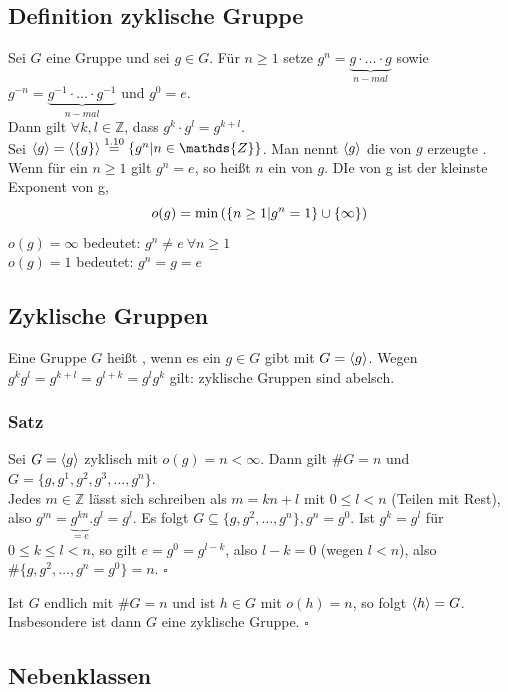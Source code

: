 \subsection{Definition zyklische Gruppe}
\label{sub:def_zyklische_gruppen}
Sei $G$ eine Gruppe und sei $g\in G$. Für $n\ge 1$ setze $g^n=\underbrace{g\cdot \dots \cdot g}_{n-mal}$ sowie $g^{-n}=\underbrace{g^{-1}\cdot \dots \cdot g^{-1}}_{n-mal}$ und $g^0=e$.\\
Dann gilt $\forall k,l\in \mathds{Z}$, dass $g^k\cdot g^l = g^{k+l}$.\\
Sei $\lh{g}=\lh{\{g\}}\stackrel{1.10}{=}\{g^n | n\in \mathds{Z}\}$. Man nennt $\langle g \rangle$ die von $g$ erzeugte . Wenn für ein $n\ge 1$ gilt $g^n=e$, so heißt $n$ ein  von $g$. DIe  von g ist der kleinste Exponent von g,
\[o(g)=\min\left( \{n\ge 1 | g^n=1\}\cup \{\infty\}\right)\]
$o(g)=\infty$ bedeutet: $g^n\not= e~\forall n\ge 1$\\
$o(g)=1$ bedeutet: $g^n=g=e$

\subsection{Zyklische Gruppen}
\label{sub:zyklische_gruppen}
Eine Gruppe $G$ heißt , wenn es ein $g\in G$ gibt mit $G=\langle g \rangle$. Wegen $g^kg^l=g^{k+l}=g^{l+k}=g^lg^k$ gilt: zyklische Gruppen sind abelsch.

\subsubsection*{Satz}
Sei $G=\langle g \rangle$ zyklisch mit $o(g)=n<\infty$. Dann gilt $\#G=n$ und $G=\{g,g^1,g^2,g^3,\dots,g^n\}$.
\\
Jedes $m\in \mathds{Z}$ lässt sich schreiben als $m=kn+l$ mit $0\le l<n$ (Teilen mit Rest), also $g^m= \underbrace{g^{kn}}_{=e}.g^l=g^l$. Es folgt $G\subseteq \{g,g^2,\dots,g^n\}, g^n=g^0$.
Ist $g^k=g^l$ für $0\le k\le l<n$, so gilt $e=g^0=g^{l-k}$, also $l-k=0$ (wegen $l<n$), also $\#\{g,g^2,\dots,g^n=g^0\}=n$.
\hfill $\square$

Ist $G$ endlich mit $\#G=n$ und ist $h\in G$ mit $o(h)=n$, so folgt $\langle h \rangle=G$. Insbesondere ist dann $G$ eine zyklische Gruppe.
\hfill $\square$

\subsection{Nebenklassen}
\label{sub:nebenklassen}
 

